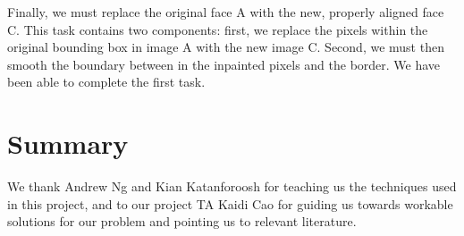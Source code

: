 \documentclass{pnastwo2}
\begin{document}
\begin{article}
Finally, we must replace the original face A with the new, properly aligned face C. This task contains two components: first, we replace the pixels within the original bounding box in image A with the new image C. Second, we must then smooth the boundary between in the inpainted pixels and the border. We have been able to complete the first task. 

\section{Summary}


\begin{acknowledgments}
We thank Andrew Ng and Kian Katanforoosh for teaching us the techniques used in this project, and to our project TA Kaidi Cao for guiding us towards workable solutions for our problem and pointing us to relevant literature.
\end{acknowledgments}




\end{article}
\end{document}
